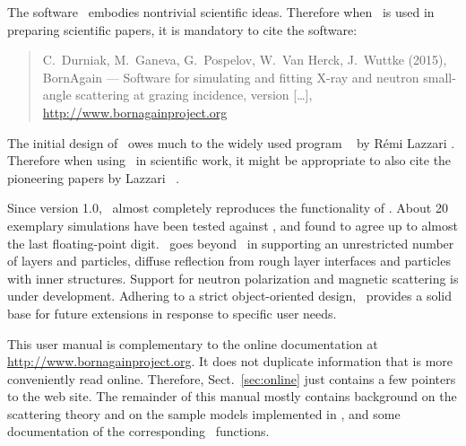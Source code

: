 The software \BornAgain\ embodies nontrivial scientific ideas.
Therefore when \BornAgain\ is used in preparing scientific papers,
it is mandatory to cite the software:
%
\begin{quote}
C.~Durniak, M.~Ganeva, G.~Pospelov, W.~Van Herck, J.~Wuttke (2015),\newline
BornAgain --- Software for simulating and fitting
X-ray and neutron small-angle scattering at grazing incidence,
version [\ldots],\newline
\url{http://www.bornagainproject.org}
\end{quote}
The initial design of \BornAgain\ owes much
to the widely used program \IsGISAXS\
%
%
by R\'emi Lazzari \cite{Laz02,Laz08}.
Therefore when using \BornAgain\ in scientific work,
it might be appropriate to also cite the pioneering papers
by Lazzari \etal\ \cite{Laz02,ReLL09}.

Since version 1.0, \BornAgain\ 
almost completely reproduces the functionality
of \IsGISAXS.
About 20 exemplary simulations have been tested against \IsGISAXS,
and found to agree up to almost the last floating-point digit.
\BornAgain\ goes beyond \IsGISAXS\
in supporting an unrestricted number of layers and particles, 
diffuse reflection from rough layer interfaces and
particles with inner structures.
Support for neutron polarization and magnetic scattering
is under development.
Adhering to a strict object-oriented design,
\BornAgain\ provides a solid base for future extensions
in response to specific user needs.



This user manual is complementary to the online documentation
at \url{http://www.bornagainproject.org}.
It does not duplicate information that is more conveniently read online.
Therefore, Sect.~\ref{sec:online} just contains a few pointers to the web site.
The remainder of this manual mostly contains background
on the scattering theory and on the sample models implemented in \BornAgain,
and some documentation of the corresponding \Python\ functions.



